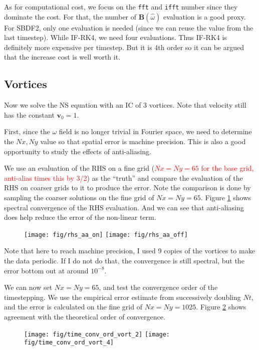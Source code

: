 \documentclass[11pt,letterpaper]{article}
\newcommand{\ve}[1]{\boldsymbol{#1}}
\newcommand{\red}{\textcolor{red}}
\begin{document}
As for computational cost, we focus on the \texttt{fft} and \texttt{ifft} number since they dominate the cost. For that, the number of $\ve B(\hat\omega)$ evaluation is a good proxy. For SBDF2, only one evaluation is needed (since we can reuse the value from the last timestep). While IF-RK4, we need four evaluations. Thus IF-RK4 is definitely more expensive per timestep. But it is 4th order so it can be argued that the increase cost is well worth it.

\subsection{Vortices}
Now we solve the NS equation with an IC of 3 vortices. Note that velocity still has the constant $\ve v_0 = 1$. 

First, since the $\omega$ field is no longer trivial in Fourier space, we need to determine the $Nx,Ny$ value so that spatial error is machine precision. This is also a good opportunity to study the effects of anti-aliasing. 

We use an evaluation of the RHS on a fine grid (\red{$Nx=Ny=65$ for the base grid, anti-alias times this by 3/2}) as the ``truth'' and compare the evaluation of the RHS on coarser grids to it to produce the error. Note the comparison is done by sampling the coarser solutions on the fine grid of $Nx = Ny = 65$. Figure \ref{fig:rhs_aa_o} shows spectral convergence of the RHS evaluation. And we can see that anti-aliasing does help reduce the error of the non-linear term.
\begin{figure}[H]
    \centering
    \texttt{[image: fig/rhs\_aa\_on]}
    \texttt{[image: fig/rhs\_aa\_off]}
    \caption{}\label{fig:rhs_aa_o}
\end{figure}
Note that here to reach machine precision, I used 9 copies of the vortices to make the data periodic. If I do not do that, the convergence is still spectral, but the error bottom out at around $10^{-8}$.

We can now set $Nx = Ny = 65$, and test the convergence order of the timestepping. We use the empirical error estimate from successively doubling $Nt$, and the error is calculated on the fine grid of $Nx = Ny = 1025$. Figure \ref{fig:time_conv_ord_vort_} shows agreement with the theoretical order of convergence.
\begin{figure}[H]
    \centering
    \texttt{[image: fig/time\_conv\_ord\_vort\_2]}
    \texttt{[image: fig/time\_conv\_ord\_vort\_4]}
    \caption{}\label{fig:time_conv_ord_vort_}
\end{figure}
\end{document}

